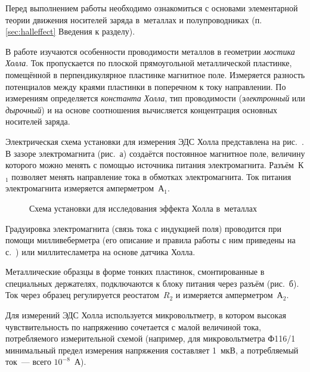 


Перед выполнением работы необходимо ознакомиться с основами
элементарной теории движения носителей заряда в~металлах и полупроводниках
(п. \ref{sec:halleffect} Введения к разделу).

В работе изучаются особенности проводимости металлов
в геометрии \emph{мостика Холла}.
Ток пропускается по плоской прямоугольной металлической пластинке, 
помещённой в перпендикулярное пластинке магнитное поле.
Измеряется разность потенциалов между краями пластинки в поперечном
к току направлении. По измерениям определяется \emph{константа Холла},
тип проводимости (\emph{электронный} или \emph{дырочный}) и на основе
соотношения  вычисляется концентрация основных
носителей заряда.

\experiment 

Электрическая схема установки для измерения ЭДС Холла представлена
на рис.~.
В зазоре электромагнита (рис.~а) создаётся постоянное магнитное
поле, величину которого можно менять с помощью источника питания электромагнита.
Разъём~К$_1$ позволяет менять направление тока в обмотках электромагнита. Ток
питания электромагнита измеряется амперметром~А$_1$.

\begin{figure}[h!]
    \centering
    \caption{Схема установки для исследования эффекта Холла в~металлах}
\end{figure}

Градуировка электромагнита (связь тока с индукцией поля) проводится 
при помощи милливеберметра (его описание и правила работы 
с ним приведены на с.~\pageref{MWB}) или миллитесламетра на основе
датчика Холла.

Металлические образцы в форме тонких пластинок, смонтированные в специальных
держателях, подключаются к блоку питания через разъём (рис.~б).
Ток через образец регулируется реостатом~$R_2$ и измеряется амперметром~А$_2$.

Для измерений ЭДС Холла используется микровольтметр, в котором
высокая чувствительность по напряжению сочетается с малой величиной тока,
потребляемого измерительной схемой
(например, для микровольтметра Ф116/1 минимальный предел измерения 
напряжения составляет 1~мкВ, а потребляемый ток~--- всего $10^{-8}$~А).

